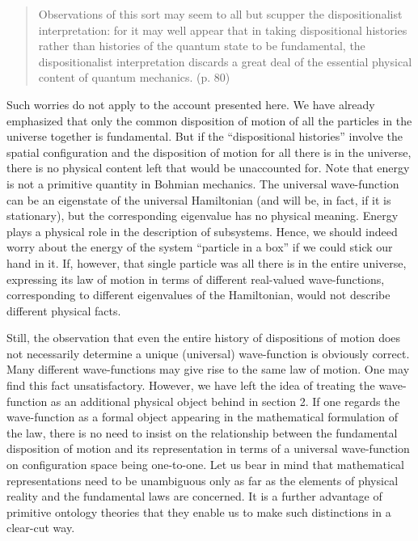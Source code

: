 \documentclass[12pt,a4paper]{article}
\theoremstyle{definition}
\begin{document}
\begin{quote} Observations of this sort may seem to all but scupper the dispositionalist interpretation: for it may well appear that in taking dispositional histories rather than histories of the quantum state to be fundamental, the dispositionalist interpretation discards a great deal of the essential physical content of quantum mechanics. (p. 80) \end{quote} 

\noindent Such worries do not apply to the account presented here. We have already emphasized that only the common disposition of motion of all the particles in the universe together is fundamental. But if the ``dispositional histories'' involve the spatial configuration and the disposition of motion for all there is in the universe, there is no physical content left that would be unaccounted for. Note that energy is not a primitive quantity in Bohmian mechanics. The universal wave-function can be an eigenstate of the universal Hamiltonian (and will be, in fact, if it is stationary), but the corresponding eigenvalue has no physical meaning. Energy plays a physical role in the description of subsystems. Hence, we should indeed worry about the energy of the system ``particle in a box'' if we could stick our hand in it. If, however, that single particle was all there is in the entire universe, expressing its law of motion in terms of different real-valued wave-functions, corresponding to different eigenvalues of the Hamiltonian, would not describe different physical facts.

Still, the observation that even the entire history of dispositions of motion does not necessarily determine a unique (universal) wave-function is obviously correct. Many different wave-functions may give rise to the same law of motion. One may find this fact unsatisfactory. However, we have left the idea of treating the wave-function as an additional physical object behind in section 2. If one regards the wave-function as a formal object appearing in the mathematical formulation of the law, there is no need to insist on the relationship between the fundamental disposition of motion and its representation in terms of a universal wave-function on configuration space being one-to-one. Let us bear in mind that mathematical representations need to be unambiguous only as far as the elements of physical reality and the fundamental laws are concerned. It is a further advantage of primitive ontology theories that they enable us to make such distinctions in a clear-cut way.
\end{document}
